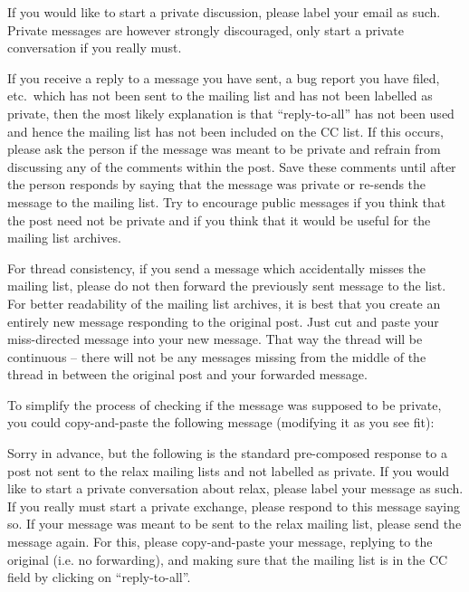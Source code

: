 If you would like to start a private discussion, please label your email as such.  Private messages are however strongly discouraged, only start a private conversation if you really must.

If you receive a reply to a message you have sent, a bug report you have filed, etc.\ which has not been sent to the mailing list and has not been labelled as private, then the most likely explanation is that ``reply-to-all'' has not been used and hence the mailing list has not been included on the CC list.  If this occurs, please ask the person if the message was meant to be private and refrain from discussing any of the comments within the post.  Save these comments until after the person responds by saying that the message was private or re-sends the message to the mailing list.  Try to encourage public messages if you think that the post need not be private and if you think that it would be useful for the mailing list archives.

For thread consistency, if you send a message which accidentally misses the mailing list, please do not then forward the previously sent message to the list.  For better readability of the mailing list archives, it is best that you create an entirely new message responding to the original post.  Just cut and paste your miss-directed message into your new message.  That way the thread will be continuous -- there will not be any messages missing from the middle of the thread in between the original post and your forwarded message.

To simplify the process of checking if the message was supposed to be private, you could copy-and-paste the following message (modifying it as you see fit):

\begin{exampleenv}
Sorry in advance, but the following is the standard pre-composed response to a post not sent to the relax mailing lists and not labelled as private.  If you would like to start a private conversation about relax, please label your message as such.  If you really must start a private exchange, please respond to this message saying so.  If your message was meant to be sent to the relax mailing list, please send the message again.  For this, please copy-and-paste your message, replying to the original (i.e. no forwarding), and making sure that the mailing list is in the CC field by clicking on ``reply-to-all''.
\end{exampleenv}




